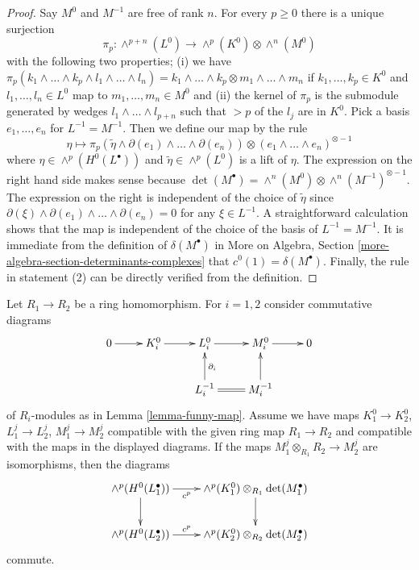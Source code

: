 \begin{proof}
Say $M^0$ and $M^{-1}$ are free of rank $n$. For every $p \geq 0$
there is a unique surjection
$$
\pi_p :
\wedge^{p + n}(L^0)
\longrightarrow
\wedge^p(K^0) \otimes \wedge^n(M^0)
$$
with the following two properties; (i) we have
$
\pi_p(k_1 \wedge \ldots \wedge k_p \wedge l_1 \wedge \ldots \wedge l_n) =
k_1 \wedge \ldots \wedge k_p \otimes
m_1 \wedge \ldots \wedge m_n
$
if $k_1, \ldots, k_p \in K^0$ and $l_1, \ldots, l_n \in L^0$ map
to $m_1, \ldots, m_n \in M^0$ and (ii) the kernel of $\pi_p$ is the
submodule generated by wedges
$l_1 \wedge \ldots \wedge l_{p + n}$ such that $> p$ of the
$l_j$ are in $K^0$. Pick a basis $e_1, \ldots, e_n$ for $L^{-1} = M^{-1}$.
Then we define our map by the rule
$$
\eta \mapsto
\pi_p(\tilde \eta \wedge \partial(e_1) \wedge \ldots \wedge \partial(e_n))
\otimes (e_1 \wedge \ldots \wedge e_n)^{\otimes -1}
$$
where $\eta \in \wedge^p(H^0(L^\bullet))$ and $\tilde \eta \in \wedge^p(L^0)$
is a lift of $\eta$. The expression on the right hand side makes sense because
$\det(M^\bullet) = \wedge^n(M^0) \otimes \wedge^n(M^{-1})^{\otimes -1}$.
The expression on the right is independent of the choice of $\tilde \eta$ since
$\partial(\xi) \wedge \partial(e_1) \wedge \ldots \wedge \partial(e_n) = 0$
for any $\xi \in L^{-1}$. A straightforward calculation shows that the map
is independent of the choice of the basis of $L^{-1} = M^{-1}$.
It is immediate from the definition of $\delta(M^\bullet)$ in
More on Algebra, Section \ref{more-algebra-section-determinants-complexes}
that $c^0(1) = \delta(M^\bullet)$. Finally, the rule in statement (2)
can be directly verified from the definition.
\end{proof}

\begin{lemma}
\label{lemma-funny-map-functorial}
Let $R_1 \to R_2$ be a ring homomorphism. For $i = 1, 2$ consider
commutative diagrams
$$
\xymatrix{
0 \ar[r] &
K_i^0 \ar[r] &
L_i^0 \ar[r] &
M_i^0 \ar[r] & 0 \\
& & L_i^{-1} \ar[u]_{\partial_i} \ar@{=}[r] &
M_i^{-1} \ar[u]
}
$$
of $R_i$-modules as in Lemma \ref{lemma-funny-map}. Assume we have
maps $K_1^0 \to K_2^0$, $L_1^j \to L_2^j$, $M_1^j \to M_2^j$
compatible with the given ring map $R_1 \to R_2$ and
compatible with the maps in the displayed diagrams. If the maps
$M_1^j \otimes_{R_1} R_2 \to M_2^j$ are isomorphisms, then
the diagrams
$$
\xymatrix{ 
\wedge^p(H^0(L_1^\bullet)) \ar[d]
\ar[r]_-{c^p} &
\wedge^p(K_1^0) \otimes_{R_1} \det(M_1^\bullet) \ar[d] \\
\wedge^p(H^0(L_2^\bullet))
\ar[r]^-{c^p} &
\wedge^p(K_2^0) \otimes_{R_2} \det(M_2^\bullet)
}
$$
commute.
\end{lemma}

